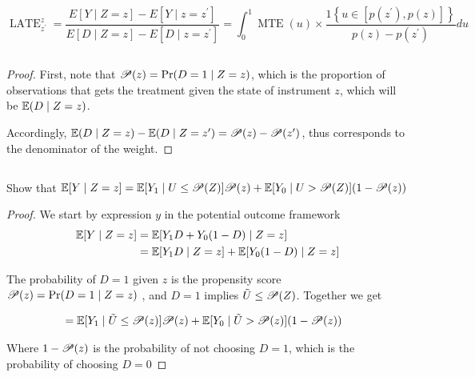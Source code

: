$$
\operatorname{LATE}_{z^{\prime}}^z=
\frac{E[Y \mid Z=z]-E\left[Y \mid z=z^{\prime}\right]}
{E[D \mid Z=z]-E\left[D \mid z=z^{\prime}\right]}
=\int_0^1 \operatorname{MTE}(u) \times 
    \frac{1\left\{u \in\left[p\left(z^{\prime}\right), p(z)\right]\right\}}
    {p(z)-p\left(z^{\prime}\right)} d u
$$

\subsection{}
\begin{proof}
    First, note that $\mathscr{P}(z) = \Pr(D=1 \mid Z=z)$, 
which is the proportion of observations that gets the treatment
given the state of instrument $z$, which will be $\operatorname{\mathbb{E}}(D \mid Z=z)$.


Accordingly, $\operatorname{\mathbb{E}}(D \mid Z=z) - \operatorname{\mathbb{E}}(D \mid Z=z') = \mathscr{P}(z) - \mathscr{P}(z')$, 
thus corresponds to the denominator of the weight.
\end{proof}


\subsection{}
Show that $\operatorname{\mathbb{E}}[Y \mid Z=z] = 
\operatorname{\mathbb{E}}[Y_1 \mid U \le \mathscr{P}(Z)]\mathscr{P}(z) + \operatorname{\mathbb{E}}[Y_0 \mid U > \mathscr{P}(Z)](1-\mathscr{P}(z))$

\begin{proof}
    We start by expression $y$ in the potential outcome framework
    \begin{align*}
        \operatorname{\mathbb{E}}[Y \mid Z=z] 
        &= \operatorname{\mathbb{E}}[ Y_1 D + Y_0 (1-D)  \mid Z=z] \\
        &= \operatorname{\mathbb{E}}[ Y_1 D \mid Z=z] + \operatorname{\mathbb{E}}[Y_0 (1-D)  \mid Z=z]\\
    \end{align*}

The probability of $D=1$ given $z$ is the propensity score $\mathscr{P}(z) = \Pr(D=1 \mid Z=z)$
, and $D=1$ implies $\tilde{U} \le \mathscr{P}(Z)$. Together we get

    \begin{align}
        \label{eq: 2_2}
        &= \operatorname{\mathbb{E}}[Y_1 \mid \tilde{U} \le \mathscr{P}(z)]\mathscr{P}(z) + \operatorname{\mathbb{E}}[Y_0 \mid \tilde{U} > \mathscr{P}(z)](1-\mathscr{P}(z))
    \end{align}
    
    Where $1-\mathscr{P}(z)$ is the probability of not choosing $D=1$, which is the probability of choosing $D=0$
\end{proof}

